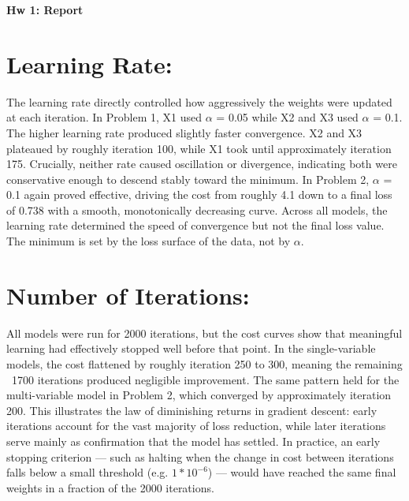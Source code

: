 \documentclass[a4paper]{article}
\begin{document}
\begin{center}
    \Huge\textbf{Hw 1: Report}
\end{center}

\section{Learning Rate:}
The learning rate directly controlled how aggressively the weights were updated at each iteration. In Problem 1, X1 used $\alpha$ = 0.05 while X2 and X3 used $\alpha$ = 0.1. The higher learning rate produced slightly faster convergence. X2 and X3 plateaued by roughly iteration 100, while X1 took until approximately iteration 175. Crucially, neither rate caused oscillation or divergence, indicating both were conservative enough to descend stably toward the minimum. In Problem 2, $\alpha$ = 0.1 again proved effective, driving the cost from roughly 4.1 down to a final loss of 0.738 with a smooth, monotonically decreasing curve. Across all models, the learning rate determined the speed of convergence but not the final loss value. The minimum is set by the loss surface of the data, not by $\alpha$.

\section{Number of Iterations:}

All models were run for 2000 iterations, but the cost curves show that meaningful learning had effectively stopped well before that point. In the single-variable models, the cost flattened by roughly iteration 250 to 300, meaning the remaining ~1700 iterations produced negligible improvement. The same pattern held for the multi-variable model in Problem 2, which converged by approximately iteration 200. This illustrates the law of diminishing returns in gradient descent: early iterations account for the vast majority of loss reduction, while later iterations serve mainly as confirmation that the model has settled. In practice, an early stopping criterion — such as halting when the change in cost between iterations falls below a small threshold (e.g. $1*10^{-6}$) — would have reached the same final weights in a fraction of the 2000 iterations.
\end{document}
